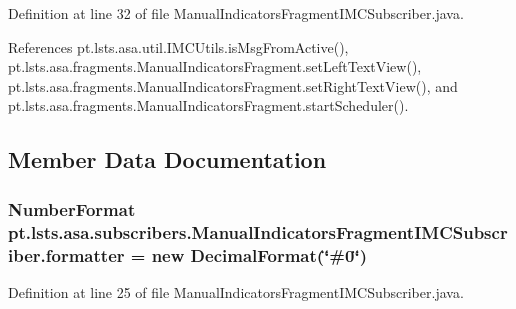 Definition at line 32 of file Manual\+Indicators\+Fragment\+I\+M\+C\+Subscriber.\+java.



References pt.\+lsts.\+asa.\+util.\+I\+M\+C\+Utils.\+is\+Msg\+From\+Active(), pt.\+lsts.\+asa.\+fragments.\+Manual\+Indicators\+Fragment.\+set\+Left\+Text\+View(), pt.\+lsts.\+asa.\+fragments.\+Manual\+Indicators\+Fragment.\+set\+Right\+Text\+View(), and pt.\+lsts.\+asa.\+fragments.\+Manual\+Indicators\+Fragment.\+start\+Scheduler().



\subsection{Member Data Documentation}
\hypertarget{classpt_1_1lsts_1_1asa_1_1subscribers_1_1ManualIndicatorsFragmentIMCSubscriber_a338c7e858b9dd40a1f6c3aed34de02fc}{}
\subsubsection[{formatter}]{\setlength{\rightskip}{0pt plus 5cm}Number\+Format pt.\+lsts.\+asa.\+subscribers.\+Manual\+Indicators\+Fragment\+I\+M\+C\+Subscriber.\+formatter = new Decimal\+Format(\char`\"{}\#0\char`\"{})\hspace{0.3cm}{\ttfamily [private]}}\label{classpt_1_1lsts_1_1asa_1_1subscribers_1_1ManualIndicatorsFragmentIMCSubscriber_a338c7e858b9dd40a1f6c3aed34de02fc}


Definition at line 25 of file Manual\+Indicators\+Fragment\+I\+M\+C\+Subscriber.\+java.

\hypertarget{classpt_1_1lsts_1_1asa_1_1subscribers_1_1ManualIndicatorsFragmentIMCSubscriber_aed562c78c365b11b8c6a12fbee977aa0}{}
